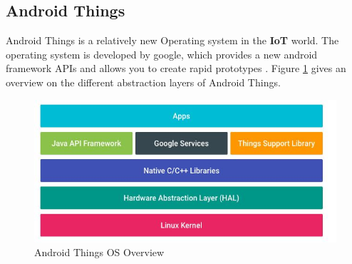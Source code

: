         \subsection{Android Things}
            Android Things is a relatively new Operating system in the \textbf{IoT} 
            \cite{IoT} world. The operating system is developed by google, 
            which provides a new android framework APIs and allows you 
            to create rapid prototypes \cite{androidThings}. Figure 
            \ref{fig:aThingsOverview} gives an overview on the different 
            abstraction layers of Android Things. 
            \begin{figure}[htbp!]
                \centering \includegraphics{grafiken/androidThingsOverview.jpg}
                \caption{Android Things OS Overview}
                \label{fig:aThingsOverview}
            \end{figure}
    
        
        \newpage
